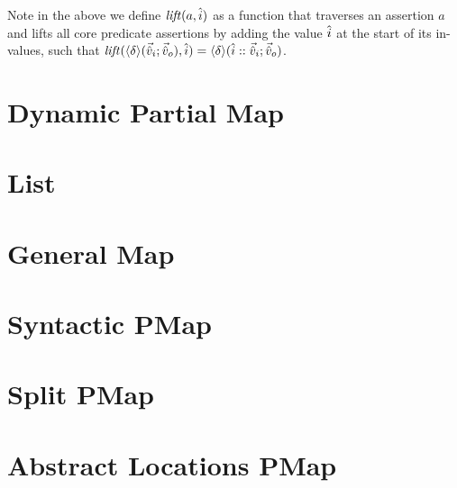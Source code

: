 Note in the above we define ${\operatorname{\mathit{lift}}}(a,\hat{i})$ as a function that traverses an assertion $a$ and lifts all core predicate assertions by adding the value $\hat{i}$ at the start of its in-values, such that ${\operatorname{\mathit{lift}}}(\left<\delta\right>\!(\vec{\hat{v}}_i;\vec{\hat{v}}_o), \hat{i})=\left<\delta\right>\!(\hat{i}::\vec{\hat{v}}_i;\vec{\hat{v}}_o)$.

\section{Dynamic Partial Map} \label{rules:dynpmap}

\section{List} \label{rules:list}

\section{General Map} \label{rules:gmap}

\section{Syntactic PMap} \label{rules:syntpmap}

\section{Split PMap} \label{rules:splitpmap}

\section{Abstract Locations PMap} \label{rules:alocpmap}
